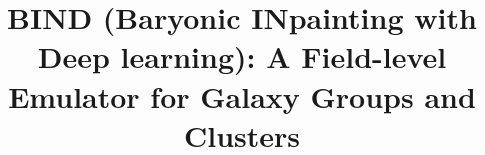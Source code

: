 \documentclass[linenumbers,trackchanges, twocolumn]{aastex701}
\begin{document}
\title{BIND (Baryonic INpainting with Deep learning): A Field-level Emulator for Galaxy Groups and Clusters}

\end{document}
